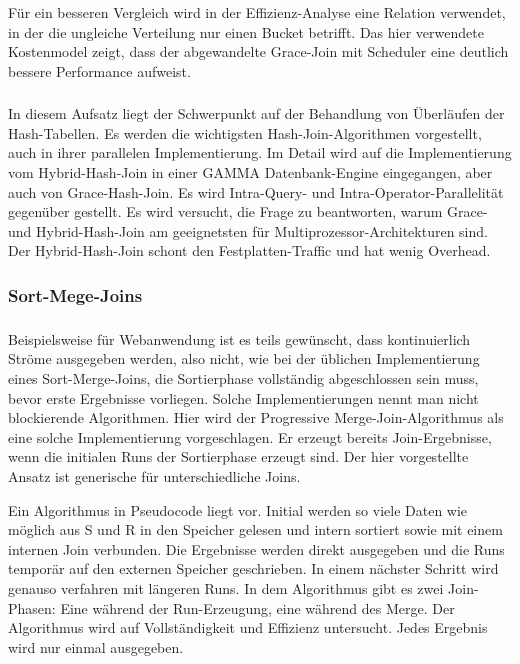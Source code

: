 \documentclass[a4paper,12pt,twoside]{article}
\begin{document}
Für ein besseren Vergleich wird in der Effizienz-Analyse eine Relation verwendet, in der die ungleiche Verteilung nur einen Bucket betrifft. Das hier verwendete Kostenmodel zeigt, dass der abgewandelte Grace-Join mit Scheduler eine deutlich bessere Performance aufweist. 

\subsubsection*{}

In diesem Aufsatz liegt der Schwerpunkt auf der Behandlung von Überläufen der Hash-Tabellen. Es werden die wichtigsten Hash-Join-Algorithmen vorgestellt, auch in ihrer parallelen Implementierung. Im Detail wird auf die Implementierung vom Hybrid-Hash-Join in einer GAMMA Datenbank-Engine eingegangen, aber auch von Grace-Hash-Join. Es wird Intra-Query- und Intra-Operator-Parallelität gegenüber gestellt. Es wird versucht, die Frage zu beantworten, warum Grace- und Hybrid-Hash-Join am geeignetsten für Multiprozessor-Architekturen sind. Der Hybrid-Hash-Join schont den Festplatten-Traffic und hat wenig Overhead. 

\subsubsection{Sort-Mege-Joins}

\subsubsection*{}

Beispielsweise für Webanwendung ist es teils gewünscht, dass kontinuierlich Ströme ausgegeben werden, also nicht, wie bei der üblichen Implementierung eines Sort-Merge-Joins, die Sortierphase vollständig abgeschlossen sein muss, bevor erste Ergebnisse vorliegen. Solche Implementierungen nennt man nicht blockierende Algorithmen. Hier wird der Progressive Merge-Join-Algorithmus als eine solche Implementierung vorgeschlagen. Er erzeugt bereits Join-Ergebnisse, wenn die initialen Runs der Sortierphase erzeugt sind. Der hier vorgestellte Ansatz ist generische für unterschiedliche Joins.

Ein Algorithmus in Pseudocode liegt vor. Initial werden so viele Daten wie möglich aus S und R in den Speicher gelesen und intern sortiert sowie mit einem internen Join verbunden. Die Ergebnisse werden direkt ausgegeben und die Runs temporär auf den externen Speicher geschrieben. In einem nächster Schritt wird genauso verfahren mit längeren Runs. In dem Algorithmus gibt es zwei Join-Phasen: Eine während der Run-Erzeugung, eine während des Merge. Der Algorithmus wird auf Vollständigkeit und Effizienz untersucht. Jedes Ergebnis wird nur einmal ausgegeben. 
\end{document}
